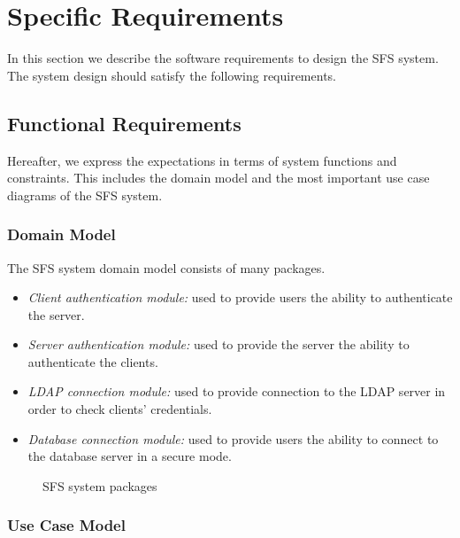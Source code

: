 \chapter{Specific Requirements}

In this section we describe the software requirements to design the
SFS system. The system design should satisfy the following
requirements.

\section{Functional Requirements} Hereafter, we express the
expectations in terms of system functions and constraints. This
includes the domain model and the most important use case diagrams
of the SFS system.

\subsection{Domain Model}

The SFS system domain model consists of many packages.

\begin{itemize}


\item \emph{Client authentication module:} used to provide users the
ability to authenticate the server.

\item \emph{Server authentication module:} used to provide the server the
ability to authenticate the clients.

\item \emph{LDAP connection module:} used to provide connection to the
LDAP server in order to check clients' credentials.

\item \emph{Database connection module:} used to provide users the
ability to connect to the database server in a secure mode.

\end{itemize}

\begin{figure}[htbp]
\begin{center}
    \caption{\label{fig1} SFS system packages}
\end{center}
\end{figure}

\subsection{Use Case Model}

